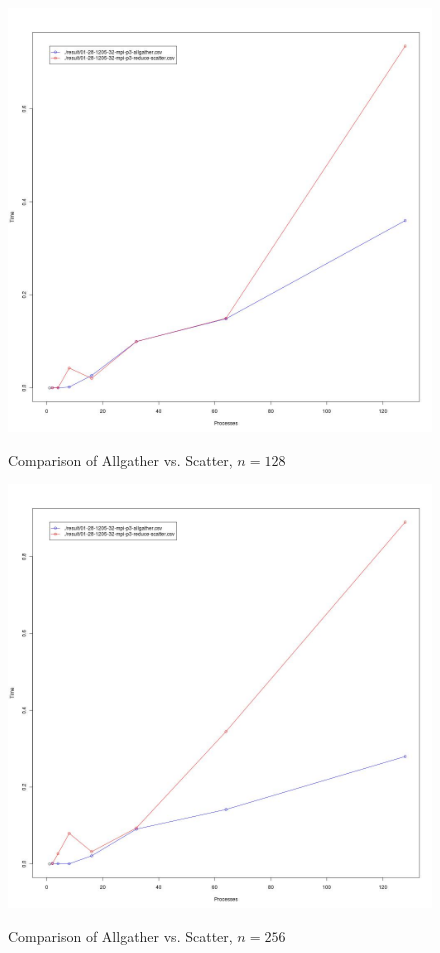 \documentclass[12pt]{article}
\begin{document}
\begin{figure}[H]
\centering
\caption{Comparison of Allgather vs. Scatter, $n=128$}
\includegraphics[scale=0.3]{candidate-graphs/mpi_p3_128.jpg}
\label{mpi_p3_128}
\end{figure}

\begin{figure}
\centering
\caption{Comparison of Allgather vs. Scatter, $n=256$}
\includegraphics[scale=0.3]{candidate-graphs/mpi_p3_256.jpg}
\label{mpi_p3_256}
\end{figure}
\end{document}
